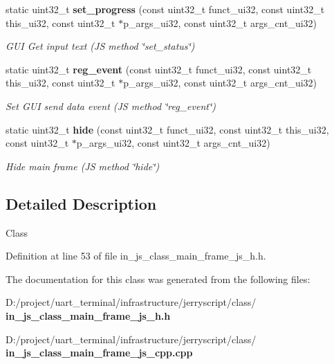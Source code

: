 \begin{DoxyCompactItemize}
static uint32\+\_\+t \textbf{ set\+\_\+progress} (const uint32\+\_\+t funct\+\_\+ui32, const uint32\+\_\+t this\+\_\+ui32, const uint32\+\_\+t $\ast$p\+\_\+args\+\_\+ui32, const uint32\+\_\+t args\+\_\+cnt\+\_\+ui32)
\begin{DoxyCompactList}\small\item\em G\+UI Get input text (JS method \char`\"{}set\+\_\+status\char`\"{}) \end{DoxyCompactList}\item 
static uint32\+\_\+t \textbf{ reg\+\_\+event} (const uint32\+\_\+t funct\+\_\+ui32, const uint32\+\_\+t this\+\_\+ui32, const uint32\+\_\+t $\ast$p\+\_\+args\+\_\+ui32, const uint32\+\_\+t args\+\_\+cnt\+\_\+ui32)
\begin{DoxyCompactList}\small\item\em Set G\+UI send data event (JS method \char`\"{}reg\+\_\+event\char`\"{}) \end{DoxyCompactList}\item 
static uint32\+\_\+t \textbf{ hide} (const uint32\+\_\+t funct\+\_\+ui32, const uint32\+\_\+t this\+\_\+ui32, const uint32\+\_\+t $\ast$p\+\_\+args\+\_\+ui32, const uint32\+\_\+t args\+\_\+cnt\+\_\+ui32)
\begin{DoxyCompactList}\small\item\em Hide main frame (JS method \char`\"{}hide\char`\"{}) \end{DoxyCompactList}\end{DoxyCompactItemize}


\subsection{Detailed Description}
Class 

Definition at line 53 of file in\+\_\+js\+\_\+class\+\_\+main\+\_\+frame\+\_\+js\+\_\+h.\+h.



The documentation for this class was generated from the following files\+:\begin{DoxyCompactItemize}
\item 
D\+:/project/uart\+\_\+terminal/infrastructure/jerryscript/class/\textbf{ in\+\_\+js\+\_\+class\+\_\+main\+\_\+frame\+\_\+js\+\_\+h.\+h}\item 
D\+:/project/uart\+\_\+terminal/infrastructure/jerryscript/class/\textbf{ in\+\_\+js\+\_\+class\+\_\+main\+\_\+frame\+\_\+js\+\_\+cpp.\+cpp}\end{DoxyCompactItemize}
